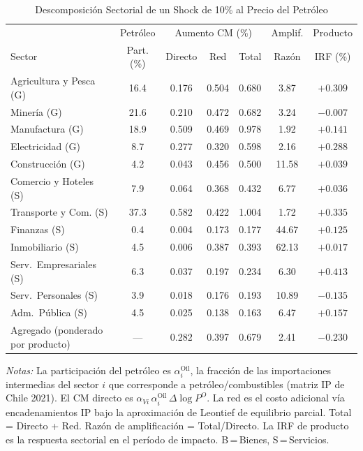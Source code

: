 \begin{table}[htbp]
\centering
\caption{Descomposición Sectorial de un Shock de 10\% al Precio del Petróleo}
\label{tab:oil_decomp}
\begin{threeparttable}
\small
\begin{tabular}{@{}l c c c c c c@{}}
\toprule
 & Petróleo & \multicolumn{3}{c}{Aumento CM (\%)} & Amplif. & Producto \\
\cmidrule(lr){3-5}
Sector & Part. (\%) & Directo & Red & Total & Razón & IRF (\%) \\
\midrule
Agricultura y Pesca (G) & 16.4 & 0.176 & 0.504 & 0.680 &  3.87 & $+0.309$ \\
Minería (G) & 21.6 & 0.210 & 0.472 & 0.682 &  3.24 & $-0.007$ \\
Manufactura (G) & 18.9 & 0.509 & 0.469 & 0.978 &  1.92 & $+0.141$ \\
Electricidad (G) &  8.7 & 0.277 & 0.320 & 0.598 &  2.16 & $+0.288$ \\
Construcción (G) &  4.2 & 0.043 & 0.456 & 0.500 & 11.58 & $+0.039$ \\
Comercio y Hoteles (S) &  7.9 & 0.064 & 0.368 & 0.432 &  6.77 & $+0.036$ \\
Transporte y Com. (S) & 37.3 & 0.582 & 0.422 & 1.004 &  1.72 & $+0.335$ \\
Finanzas (S) &  0.4 & 0.004 & 0.173 & 0.177 & 44.67 & $+0.125$ \\
Inmobiliario (S) &  4.5 & 0.006 & 0.387 & 0.393 & 62.13 & $+0.017$ \\
Serv.\ Empresariales (S) &  6.3 & 0.037 & 0.197 & 0.234 &  6.30 & $+0.413$ \\
Serv.\ Personales (S) &  3.9 & 0.018 & 0.176 & 0.193 & 10.89 & $-0.135$ \\
Adm.\ Pública (S) &  4.5 & 0.025 & 0.138 & 0.163 &  6.47 & $+0.157$ \\
\midrule
Agregado (ponderado por producto) & --- & 0.282 & 0.397 & 0.679 &  2.41 & $-0.230$ \\
\bottomrule
\end{tabular}
\begin{tablenotes}[flushleft]
\footnotesize
\item \textit{Notas:} La participación del petróleo es $\alpha^{\text{Oil}}_i$, la fracción de las importaciones intermedias del sector $i$ que corresponde a petróleo/combustibles (matriz IP de Chile 2021). El CM directo es $\alpha_{Vi}\,\alpha^{\text{Oil}}_i\,\Delta\log P^O$. La red es el costo adicional vía encadenamientos IP bajo la aproximación de Leontief de equilibrio parcial. Total = Directo + Red. Razón de amplificación = Total/Directo. La IRF de producto es la respuesta sectorial en el período de impacto. B\,=\,Bienes, S\,=\,Servicios.
\end{tablenotes}
\end{threeparttable}
\end{table}
